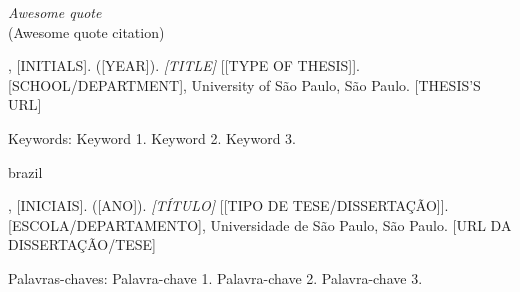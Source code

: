 
\begin{epigrafe}
  \vspace*{\fill}
	\begin{flushright}
	  \textit{Awesome quote} \\
		(Awesome quote citation)
	\end{flushright}
\end{epigrafe}


\setlength{\absparsep}{18pt}
\begin{resumo}

\begin{flushleft}
[SURNAME], [INITIALS]. ([YEAR]). \textit{[TITLE]} [[TYPE OF THESIS]]. [SCHOOL/DEPARTMENT], University of São Paulo, São Paulo. [THESIS'S URL]
\end{flushleft}

\lipsum[1]

Keywords: Keyword 1. Keyword 2. Keyword 3.
\end{resumo}


\begin{resumo}[RESUMO]
\begin{otherlanguage*}{brazil}

\begin{flushleft}
[SOBRENOME], [INICIAIS]. ([ANO]). \textit{[TÍTULO]} [[TIPO DE TESE/DISSERTAÇÃO]]. [ESCOLA/DEPARTAMENTO], Universidade de São Paulo, São Paulo. [URL DA DISSERTAÇÃO/TESE]
\end{flushleft}

\lipsum[1]

Palavras-chaves: Palavra-chave 1. Palavra-chave 2. Palavra-chave 3.
\end{otherlanguage*}
\end{resumo}


